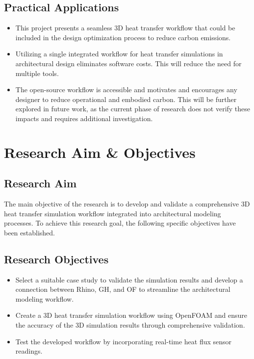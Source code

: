 \subsection{Practical Applications}
\begin{itemize}
\item This project presents a seamless 3D heat transfer workflow that could be included in the design optimization process to reduce carbon emissions.
\item  Utilizing a single integrated workflow for heat transfer simulations in architectural design eliminates software costs. This will reduce the need for multiple tools.

\item The open-source workflow is accessible and motivates and encourages any designer to reduce operational and embodied carbon. This will be further explored in future work, as the current phase of research does not verify these impacts and requires additional investigation.



\end{itemize}
\section{Research Aim \& Objectives}
\subsection{Research Aim}
The main objective of the research is to develop and validate a comprehensive 3D heat transfer simulation workflow integrated into architectural modeling processes. To achieve this research goal, the following specific objectives have been established.

\subsection{Research Objectives}
\begin{itemize}
    \item Select a suitable case study to validate the simulation results and develop a connection between Rhino, \gls{GH}, and \gls{OF} to streamline the architectural modeling workflow. 
    \item  Create a 3D heat transfer simulation workflow using OpenFOAM and ensure the accuracy of the 3D simulation results through comprehensive validation.
    \item Test the developed workflow by incorporating real-time heat flux sensor readings.
 
\end{itemize}







